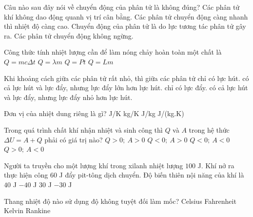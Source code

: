 \begin{ex}
Câu nào sau đây nói về chuyển động của phân tử là không đúng?
\choice
{Các phân tử khí không dao động quanh vị trí cân bằng.}
{Các phân tử chuyển động càng nhanh thì nhiệt độ càng cao.}
{\True Chuyển động của phân tử là do lực tương tác phân tử gây ra.}
{Các phân tử chuyển động không ngừng.}
\end{ex}

\begin{ex}
Công thức tính nhiệt lượng cần để làm nóng chảy hoàn toàn một chất là
\choice
{$Q=mc\Delta t$}
{\True $Q=\lambda m$}
{$Q=Pt$}
{$Q=Lm$}
\loigiai{\[Q=\lambda m.\]}
\end{ex}

\begin{ex}
Khi khoảng cách giữa các phân tử rất nhỏ, thì giữa các phân tử
\choice
{chỉ có lực hút.}
{\True có cả lực hút và lực đẩy, nhưng lực đẩy lớn hơn lực hút.}
{chỉ có lực đẩy.}
{có cả lực hút và lực đẩy, nhưng lực đẩy nhỏ hơn lực hút.}
\end{ex}

\begin{ex}
Đơn vị của nhiệt dung riêng là gì?
\choice
{J/K}
{kg/K}
{J/kg}
{\True J/(kg.K)}
\end{ex}

\begin{ex}
Trong quá trình chất khí nhận nhiệt và sinh công thì $Q$ và $A$ trong hệ thức $\Delta U=A+Q$ phải có giá trị nào?
\choice
{$Q>0;\ A>0$}
{$Q<0;\ A>0$}
{$Q<0;\ A<0$}
{\True $Q>0;\ A<0$}
\end{ex}

\begin{ex}
Người ta truyền cho một lượng khí trong xilanh nhiệt lượng $100$ J. Khí nở ra thực hiện công $60$ J đẩy pit-tông dịch chuyển. Độ biến thiên nội năng của khí là
\choice
{\True $40$ J}
{$-40$ J}
{$30$ J}
{$-30$ J}
\loigiai{\[\Delta U=Q-W=100-60=40\ \mathrm{J}.\]}
\end{ex}

\begin{ex}
Thang nhiệt độ nào sử dụng độ không tuyệt đối làm mốc?
\choice
{Celsius}
{Fahrenheit}
{\True Kelvin}
{Rankine}
\end{ex}

